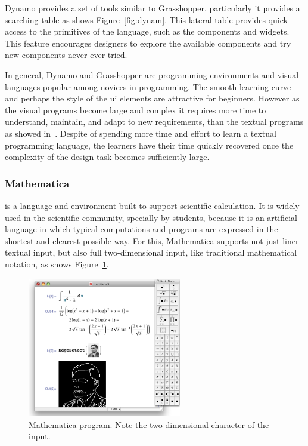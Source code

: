 Dynamo provides a set of tools similar to Grasshopper, particularly it provides a searching table as shows Figure~\ref{fig:dynam}. This lateral table provides quick access to the primitives of the language, such as the components and widgets. This feature encourages designers to explore the available components and try new components never ever tried.  

In general, Dynamo and Grasshopper are programming environments and visual languages popular among novices in programming. The smooth learning curve and perhaps the style of the \ac{ui} elements are attractive for beginners. However as the visual programs become large and complex it requires more time to understand, maintain, and adapt to new requirements, than the textual programs as showed in~\cite{leitao2011programming}. Despite of spending more time and effort to learn a textual programming language, the learners have their time quickly recovered once the complexity of the design task becomes sufficiently large.

\subsubsection{Mathematica~\cite{wolfram1991mathematica}} is a language and environment built to support scientific calculation. It is widely used in the scientific community, specially by students, because it is an artificial language in which typical computations and programs are expressed in the shortest and clearest possible way. For this, Mathematica supports not just liner textual input, but also full two-dimensional input, like traditional mathematical notation, as shows Figure~\ref{fig:math}.

\begin{figure}
  \vspace{-35pt}
  \begin{center}
    \includegraphics[width=0.6\textwidth]{img/mathematica}
  \end{center}
  \vspace{-23pt}
 \caption{Mathematica program. Note the two-dimensional character of the input.}  
  \vspace{-25pt}
    \label{fig:math}
\end{figure}

